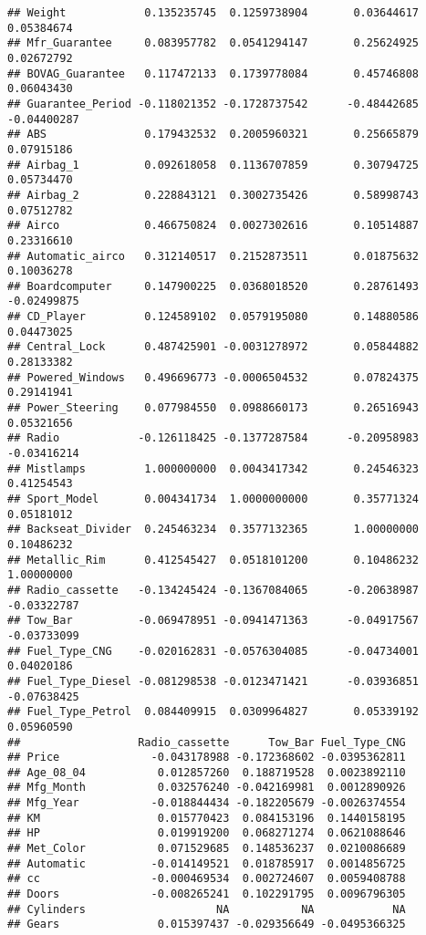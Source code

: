 \documentclass[]{article}
\begin{document}
\begin{verbatim}
## Weight            0.135235745  0.1259738904       0.03644617   0.05384674
## Mfr_Guarantee     0.083957782  0.0541294147       0.25624925   0.02672792
## BOVAG_Guarantee   0.117472133  0.1739778084       0.45746808   0.06043430
## Guarantee_Period -0.118021352 -0.1728737542      -0.48442685  -0.04400287
## ABS               0.179432532  0.2005960321       0.25665879   0.07915186
## Airbag_1          0.092618058  0.1136707859       0.30794725   0.05734470
## Airbag_2          0.228843121  0.3002735426       0.58998743   0.07512782
## Airco             0.466750824  0.0027302616       0.10514887   0.23316610
## Automatic_airco   0.312140517  0.2152873511       0.01875632   0.10036278
## Boardcomputer     0.147900225  0.0368018520       0.28761493  -0.02499875
## CD_Player         0.124589102  0.0579195080       0.14880586   0.04473025
## Central_Lock      0.487425901 -0.0031278972       0.05844882   0.28133382
## Powered_Windows   0.496696773 -0.0006504532       0.07824375   0.29141941
## Power_Steering    0.077984550  0.0988660173       0.26516943   0.05321656
## Radio            -0.126118425 -0.1377287584      -0.20958983  -0.03416214
## Mistlamps         1.000000000  0.0043417342       0.24546323   0.41254543
## Sport_Model       0.004341734  1.0000000000       0.35771324   0.05181012
## Backseat_Divider  0.245463234  0.3577132365       1.00000000   0.10486232
## Metallic_Rim      0.412545427  0.0518101200       0.10486232   1.00000000
## Radio_cassette   -0.134245424 -0.1367084065      -0.20638987  -0.03322787
## Tow_Bar          -0.069478951 -0.0941471363      -0.04917567  -0.03733099
## Fuel_Type_CNG    -0.020162831 -0.0576304085      -0.04734001   0.04020186
## Fuel_Type_Diesel -0.081298538 -0.0123471421      -0.03936851  -0.07638425
## Fuel_Type_Petrol  0.084409915  0.0309964827       0.05339192   0.05960590
##                  Radio_cassette      Tow_Bar Fuel_Type_CNG
## Price              -0.043178988 -0.172368602 -0.0395362811
## Age_08_04           0.012857260  0.188719528  0.0023892110
## Mfg_Month           0.032576240 -0.042169981  0.0012890926
## Mfg_Year           -0.018844434 -0.182205679 -0.0026374554
## KM                  0.015770423  0.084153196  0.1440158195
## HP                  0.019919200  0.068271274  0.0621088646
## Met_Color           0.071529685  0.148536237  0.0210086689
## Automatic          -0.014149521  0.018785917  0.0014856725
## cc                 -0.000469534  0.002724607  0.0059408788
## Doors              -0.008265241  0.102291795  0.0096796305
## Cylinders                    NA           NA            NA
## Gears               0.015397437 -0.029356649 -0.0495366325

\end{verbatim}
\end{document}
